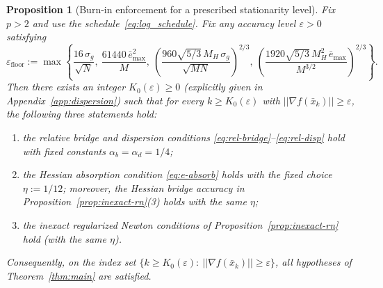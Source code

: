 \documentclass[11pt,a4paper]{article}
\def\norm#1{||#1||}%
\newtheorem{proposition}[theorem]{Proposition}
\newcommand{\norm}[1]{\left\|#1\right\|}
\begin{document}
	\begin{proposition}[Burn-in enforcement for a prescribed stationarity level]\label{prop:burnin_enforce}
		Fix $p>2$ and use the schedule~\eqref{eq:log_schedule}. Fix any accuracy level $\varepsilon>0$ satisfying
		\begin{equation}\label{eq:eps_floor}
			\varepsilon_{\mathrm{floor}}
			:=\max\left\{
			\frac{16\,\sigma_g}{\sqrt N},\ 
			\frac{61440\,\bar e_{\max}^2}{M},\
			\left(\frac{960\sqrt{5/3}\,M_H\,\sigma_g}{\sqrt{MN}}\right)^{\!\!2/3},\
			\left(\frac{1920\sqrt{5/3}\,M_H^2\,\bar e_{\max}}{M^{3/2}}\right)^{\!\!2/3}
			\right\}.
		\end{equation}
		Then there exists an integer $K_0(\varepsilon)\ge 0$ (explicitly given in Appendix~\ref{app:dispersion}) such that
		for every $k\ge K_0(\varepsilon)$ with $\norm{\nabla f(\bar x_k)}\ge \varepsilon$, the following three statements hold:
		\begin{enumerate}[leftmargin=1.2em,itemsep=2pt]
			\item the relative bridge and dispersion conditions \eqref{eq:rel-bridge}--\eqref{eq:rel-disp} hold with fixed constants
			$\alpha_b=\alpha_d=1/4$;
			\item the Hessian absorption condition \eqref{eq:e-absorb} holds with the fixed choice $\eta:=1/12$; moreover, the Hessian bridge accuracy in Proposition~\ref{prop:inexact-rn}(3) holds with the same $\eta$;
			\item the inexact regularized Newton conditions of Proposition~\ref{prop:inexact-rn} hold (with the same $\eta$).
		\end{enumerate}
		Consequently, on the index set $\{k\ge K_0(\varepsilon):\ \norm{\nabla f(\bar x_k)}\ge \varepsilon\}$,
		all hypotheses of Theorem~\ref{thm:main} are satisfied.
	\end{proposition}
	
\end{document}
